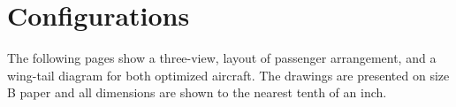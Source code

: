 \documentclass{article}
\begin{document}
    \section{Configurations}
    \begin{flushleft}
        The following pages show a three-view, layout of passenger arrangement,
        and a wing-tail diagram for both optimized aircraft. The drawings are
        presented on size B paper and all dimensions are shown to the nearest
        tenth of an inch.
    \end{flushleft}
\end{document}
